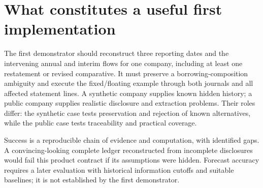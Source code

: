 \section{What constitutes a useful first implementation}

The first demonstrator should reconstruct three reporting dates and the
intervening annual and interim flows for one company, including at least one
restatement or revised comparative. It must preserve a borrowing-composition
ambiguity and execute the fixed/floating example through both journals and all
affected statement lines. A synthetic company supplies known hidden history;
a public company supplies realistic disclosure and extraction problems. Their
roles differ: the synthetic case tests preservation and rejection of known
alternatives, while the public case tests traceability and practical coverage.

Success is a reproducible chain of evidence and computation, with identified
gaps. A convincing-looking complete ledger reconstructed from incomplete
disclosures would fail this product contract if its assumptions were hidden.
Forecast accuracy requires a later evaluation with historical information
cutoffs and suitable baselines; it is not established by the first demonstrator.
